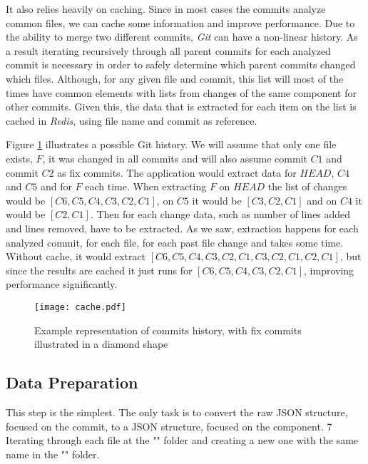 It also relies heavily on caching. Since in most cases the commits analyze common files, we can cache some information and improve performance. 
Due to the ability to merge two different commits, \emph{Git} can have a non-linear history. 
As a result iterating recursively through all parent commits for each analyzed commit is necessary in order to safely determine which parent commits changed which files. 
Although, for any given file and commit, this list will most of the times have common elements with lists from changes of the same component for other commits. 
Given this, the data that is extracted for each item on the list is cached in \emph{Redis}, using file name and commit as reference.

Figure \ref{fig:cache} illustrates a possible Git history. We will assume that only one file exists, $F$, it was changed in all commits and will also assume commit $C1$ and commit $C2$ as fix commits. 
The application would extract data for $HEAD$, $C4$ and $C5$ and for $F$ each time. When extracting $F$ on $HEAD$ the list of changes would be $[C6, C5, C4, C3, C2, C1]$, on $C5$ it would be $[C3, C2, C1]$ and on $C4$ it would be $[C2, C1]$.
Then for each change data, such as number of lines added and lines removed, have to be extracted. 
As we saw, extraction happens for each analyzed commit, for each file, for each past file change and takes some time.
Without cache, it would extract $[C6, C5, C4, C3, C2, C1, C3, C2, C1, C2, C1]$, but since the results are cached it just runs for $[C6, C5, C4, C3, C2, C1]$, improving performance significantly.
%
\begin{figure}[ht]
  \begin{center}
    \leavevmode
    \texttt{[image: cache.pdf]}
    \caption{Example representation of commits history, with fix commits illustrated in a diamond shape}
    \label{fig:cache}
  \end{center}
\end{figure}


\subsection{Data Preparation}

This step is the simplest. The only task is to convert the raw JSON structure, focused on the commit, to a JSON structure, focused on the component. 7
Iterating through each file at the "" folder and creating a new one with the same name in the "" folder.

